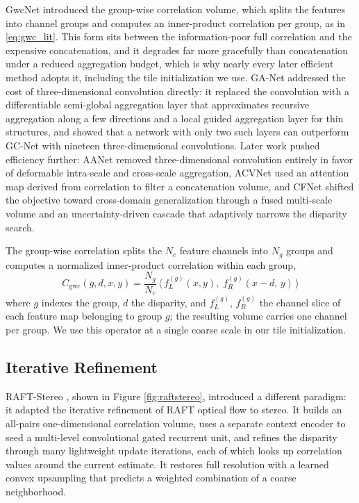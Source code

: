 GwcNet \cite{guo2019gwcnet} introduced the group-wise correlation
volume, which splits the features into channel groups and computes an
inner-product correlation per group, as in \eqref{eq:gwc_lit}. This form
sits between the information-poor full correlation and the expensive
concatenation, and it degrades far more gracefully than concatenation
under a reduced aggregation budget, which is why nearly every later
efficient method adopts it, including the tile initialization we use.
GA-Net \cite{zhang2019ganet} addressed the cost of
three-dimensional convolution directly: it replaced the convolution with
a differentiable semi-global aggregation layer that approximates
recursive aggregation along a few directions and a local guided
aggregation layer for thin structures, and showed that a network with
only two such layers can outperform GC-Net with nineteen
three-dimensional convolutions. Later work pushed efficiency further:
AANet \cite{xu2020aanet} removed
three-dimensional convolution entirely in favor of deformable intra-scale
and cross-scale aggregation, ACVNet \cite{xu2022acvnet} used an
attention map derived from correlation to filter a concatenation volume,
and CFNet \cite{shen2021cfnet} shifted the objective toward cross-domain
generalization through a fused multi-scale volume and an
uncertainty-driven cascade that adaptively narrows the disparity search.

The group-wise correlation \cite{guo2019gwcnet} splits the $N_c$ feature
channels into $N_g$ groups and computes a normalized inner-product
correlation within each group,
\begin{equation}
C_{\mathrm{gwc}}(g, d, x, y) = \frac{N_g}{N_c}\,
  \big\langle\, f_L^{(g)}(x, y),\; f_R^{(g)}(x - d,\, y) \,\big\rangle
\label{eq:gwc_lit}
\end{equation}
where $g$ indexes the group, $d$ the disparity, and $f_L^{(g)}$,
$f_R^{(g)}$ the channel slice of each feature map belonging to group $g$;
the resulting volume carries one channel per group. We use this operator
at a single coarse scale in our tile initialization.

\FloatBarrier
\subsection{Iterative Refinement}
RAFT-Stereo \cite{lipson2021raftstereo}, shown in Figure
\ref{fig:raftstereo}, introduced a different paradigm: it adapted the
iterative refinement of RAFT optical flow to stereo. It builds an all-pairs
one-dimensional correlation volume, uses a separate context encoder to
seed a multi-level convolutional gated recurrent unit, and refines the
disparity through many lightweight update iterations, each of which looks
up correlation values around the current estimate. It restores full
resolution with a learned convex upsampling that predicts a weighted
combination of a coarse neighborhood.

